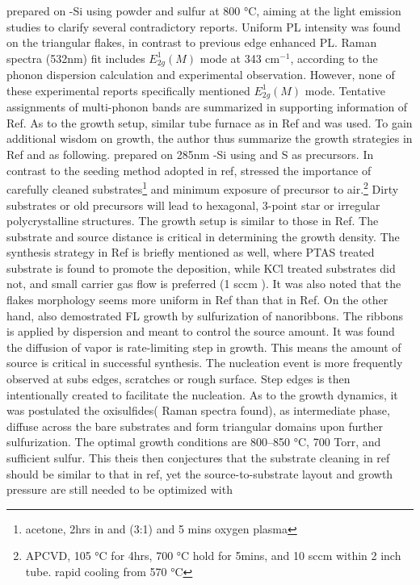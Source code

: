 \citeauthor{Peimyoo2013} prepared  on -Si using  powder and sulfur at 800 \si{\degreeCelsius}, aiming at the light emission studies to clarify several contradictory reports.\cite{Peimyoo2013} Uniform PL intensity was found on the triangular  flakes, in contrast to previous edge enhanced PL.\cite{Berkdemir2013} Raman spectra (532nm) fit includes $E_{2g}^1(M)$ mode at 343 cm$^{-1}$, according to the phonon dispersion calculation \cite{Molina-Sanchez2011} and experimental observation\cite{Zeng2013a,Zhao2013,Lee2013}. However, none of these experimental reports specifically mentioned $E_{2g}^1(M)$ mode. Tentative assignments of multi-phonon bands are summarized in supporting information of Ref\cite{Zhao2013}. As to the growth setup, similar tube furnace as in Ref \cite{VanderZande2013} and \cite{Najmaei2013} was used. To gain additional wisdom on  growth, the author thus summarize the growth strategies in Ref \cite{VanderZande2013} and \cite{Najmaei2013} as following. \citeauthor{VanderZande2013} prepared  on 285nm -Si using  and S as precursors.\cite{VanderZande2013} In contrast to the seeding method adopted in ref\cite{Lee2013,Lee2012b}, \citeauthor{VanderZande2013} stressed the importance of carefully cleaned substrates\footnote{acetone, 2hrs in  and  (3:1) and 5 mins oxygen plasma} and minimum exposure of precursor to air.\footnote{APCVD, 105 \si{\degreeCelsius} for 4hrs, 700 \si{\degreeCelsius} hold for 5mins, and 10 sccm  within 2 inch tube. rapid cooling from 570 \si{\degreeCelsius}} Dirty substrates or old precursors will lead to hexagonal, 3-point star or irregular polycrystalline structures. The growth setup is similar to those in Ref\cite{Lee2012b}. The substrate and  source distance is critical in determining the growth density. The synthesis strategy in Ref\cite{Lee2013,Lee2012b} is briefly mentioned as well, where PTAS treated substrate is found to promote the deposition, while KCl treated substrates did not, and small carrier gas flow is preferred (1 sccm ). It was also noted that the  flakes morphology seems more uniform in Ref\cite{VanderZande2013} than that in Ref\cite{Lee2012b}. On the other hand, \citeauthor{Najmaei2013} also demostrated  FL growth by sulfurization of  nanoribbons.\cite{Najmaei2013} The ribbons is applied by dispersion and meant to control the source amount. It was found the diffusion of vapor  is rate-limiting step in  growth. This means the amount of source is critical in successful synthesis. The nucleation event is more frequently observed at subs edges, scratches or rough surface. Step edges is then intentionally created to facilitate the nucleation. As to the growth dynamics, it was postulated the oxisulfides( Raman spectra found), as intermediate phase, diffuse across the bare substrates and form triangular domains upon further sulfurization. The optimal growth conditions are 800--850 \si{\degreeCelsius}, 700 Torr, and sufficient sulfur. This theis then conjectures that the substrate cleaning in ref\cite{Peimyoo2013} should be similar to that in ref\cite{VanderZande2013}, yet the source-to-substrate layout and growth pressure are still needed to be optimized with 